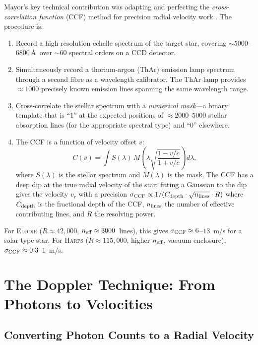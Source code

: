 \documentclass[12pt]{article}
\begin{document}
Mayor's key technical contribution was adapting and perfecting the
\emph{cross-correlation function} (CCF) method for precision radial
velocity work \citep{Baranne1996}.  The procedure is:
\begin{enumerate}
  \item Record a high-resolution echelle spectrum of the target star,
    covering $\sim 5000$--$6800$\,\AA\ over $\sim 60$ spectral
    orders on a CCD detector.
  \item Simultaneously record a thorium-argon (ThAr) emission lamp
    spectrum through a second fibre as a wavelength calibrator.
    The ThAr lamp provides $\approx 1000$ precisely known emission
    lines spanning the same wavelength range.
  \item Cross-correlate the stellar spectrum with a
    \emph{numerical mask}---a binary template that is ``1'' at the
    expected positions of $\approx2000$--$5000$ stellar absorption
    lines (for the appropriate spectral type) and ``0'' elsewhere.
  \item The CCF is a function of velocity offset $v$:
    \begin{equation}\label{eq:ccf}
      C(v) = \int S(\lambda)\, M\!\left(\lambda\sqrt{\frac{1-v/c}{1+v/c}}\right)
      d\lambda,
    \end{equation}
    where $S(\lambda)$ is the stellar spectrum and $M(\lambda)$ is
    the mask.  The CCF has a deep dip at the true radial velocity of
    the star; fitting a Gaussian to the dip gives the velocity
    $v_r$ with a precision $\sigma_{\rm CCF} \propto 1/(C_{\rm
    depth}\cdot\sqrt{n_{\rm lines}}\cdot R)$ where $C_{\rm depth}$
    is the fractional depth of the CCF, $n_{\rm lines}$ the number
    of effective contributing lines, and $R$ the resolving power.
\end{enumerate}
For \textsc{Elodie} ($R \approx 42{,}000$, $n_{\rm eff}\approx 3000$~lines),
this gives $\sigma_{\rm CCF} \approx 6$--$13$~m/s for a solar-type star.
For \textsc{Harps} ($R \approx 115{,}000$, higher $n_{\rm eff}$, vacuum
enclosure), $\sigma_{\rm CCF} \approx 0.3$--$1$~m/s.

\section{The Doppler Technique: From Photons to Velocities}
\label{sec:doppler}

\subsection{Converting Photon Counts to a Radial Velocity}
\end{document}

